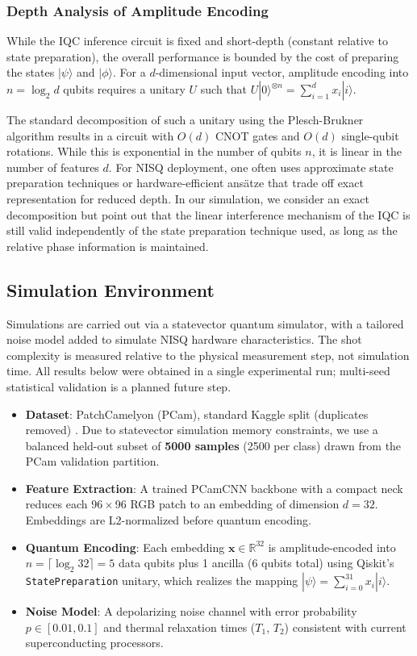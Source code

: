 \documentclass[conference]{IEEEtran}
\begin{document}
\subsubsection{Depth Analysis of Amplitude Encoding}
While the IQC inference circuit is fixed and short-depth (constant relative to state preparation), the overall performance is bounded by the cost of preparing the states $|\psi\rangle$ and $|\phi\rangle$. For a $d$-dimensional input vector, amplitude encoding into $n = \log_2 d$ qubits requires a unitary $U$ such that $U|0\rangle^{\otimes n} = \sum_{i=1}^d x_i |i\rangle$.

The standard decomposition of such a unitary using the Plesch-Brukner algorithm \cite{plesch2011quantum} results in a circuit with $O(d)$ CNOT gates and $O(d)$ single-qubit rotations. While this is exponential in the number of qubits $n$, it is linear in the number of features $d$. For NISQ deployment, one often uses approximate state preparation techniques or hardware-efficient ans\"atze that trade off exact representation for reduced depth. In our simulation, we consider an exact decomposition but point out that the linear interference mechanism of the IQC is still valid independently of the state preparation technique used, as long as the relative phase information is maintained.

\subsection{Simulation Environment}
Simulations are carried out via a statevector quantum simulator, with a tailored noise model added to simulate NISQ hardware characteristics. The shot complexity is measured relative to the physical measurement step, not simulation time. All results below were obtained in a single experimental run; multi-seed statistical validation is a planned future step.
\begin{itemize}
    \item \textbf{Dataset}: PatchCamelyon (PCam), standard Kaggle split (duplicates removed) \cite{pcam_veeling2018}. Due to statevector simulation memory constraints, we use a balanced held-out subset of \textbf{5000 samples} (2500 per class) drawn from the PCam validation partition.
    \item \textbf{Feature Extraction}: A trained PCamCNN backbone with a compact neck reduces each 96\,$\times$\,96 RGB patch to an embedding of dimension $d = 32$. Embeddings are L2-normalized before quantum encoding.
    \item \textbf{Quantum Encoding}: Each embedding $\mathbf{x} \in \mathbb{R}^{32}$ is amplitude-encoded into $n = \lceil \log_2 32 \rceil = 5$ data qubits plus 1 ancilla (6 qubits total) using Qiskit's \texttt{StatePreparation} unitary, which realizes the mapping $|\psi\rangle = \sum_{i=0}^{31} x_i|i\rangle$.
    \item \textbf{Noise Model}: A depolarizing noise channel with error probability $p \in [0.01, 0.1]$ and thermal relaxation times ($T_1$, $T_2$) consistent with current superconducting processors.
\end{itemize}
\end{document}

